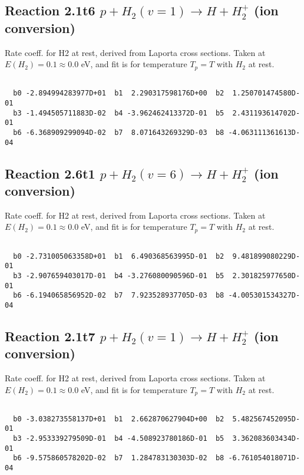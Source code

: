 \documentclass[12pt,dvipdfmx]{article}
\begin{document}
\newpage
\subsection{
Reaction 2.1t6
$ p + H_2(v=1) \rightarrow H + H_2^+$ (ion conversion)
}
Rate coeff. for H2 at rest, derived from Laporta cross sections.
Taken at $E(H_2) = 0.1 \approx 0.0$ eV,  and fit is for temperature $T_p=T$ with $H_2$ at rest.

\begin{small}\begin{verbatim}

  b0 -2.894994283977D+01  b1  2.290317598176D+00  b2  1.250701474580D-01
  b3 -1.494505711883D-02  b4 -3.962462413372D-01  b5  2.431193614702D-01
  b6 -6.368909299094D-02  b7  8.071643269329D-03  b8 -4.063111361613D-04

\end{verbatim}\end{small}

\newpage
\subsection{
Reaction 2.6t1
$ p + H_2(v=6) \rightarrow H + H_2^+$ (ion conversion)
}
Rate coeff. for H2 at rest, derived from Laporta cross sections.
Taken at $E(H_2) = 0.1 \approx 0.0$ eV,  and fit is for temperature $T_p=T$ with $H_2$ at rest.

\begin{small}\begin{verbatim}

  b0 -2.731005063358D+01  b1  6.490368563995D-01  b2  9.481899080229D-01
  b3 -2.907659403017D-01  b4 -3.276080090596D-01  b5  2.301825977650D-01
  b6 -6.194065856952D-02  b7  7.923528937705D-03  b8 -4.005301534327D-04

\end{verbatim}\end{small}

\newpage
\subsection{
Reaction 2.1t7
$ p + H_2(v=1) \rightarrow H + H_2^+$ (ion conversion)
}
Rate coeff. for H2 at rest, derived from Laporta cross sections.
Taken at $E(H_2) = 0.1 \approx 0.0$ eV,  and fit is for temperature $T_p=T$ with $H_2$ at rest.

\begin{small}\begin{verbatim}

  b0 -3.038273558137D+01  b1  2.662870627904D+00  b2  5.482567452095D-01
  b3 -2.953339279509D-01  b4 -4.508923780186D-01  b5  3.362083603434D-01
  b6 -9.575860578202D-02  b7  1.284783130303D-02  b8 -6.761054018071D-04

\end{verbatim}\end{small}
\end{document}

